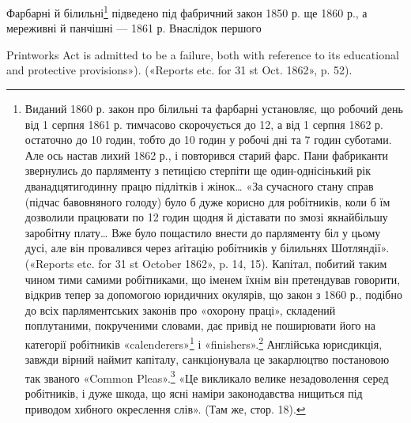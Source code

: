 Фарбарні й білильні\footnote{
Виданий 1860 р. закон про білильні та фарбарні установляє,
що робочий день від 1 серпня 1861 р. тимчасово скорочується до 12, а
від 1 серпня 1862 р. остаточно до 10 годин, тобто до 10 годин у робочі
дні та 7 годин суботами. Але ось настав лихий 1862 р., і повторився
старий фарс. Пани фабриканти звернулись до парляменту з петицією
стерпіти ще один-однісінький рік дванадцятигодинну працю підлітків
і жінок\dots{} «За сучасного стану справ (підчас бавовняного голоду) було б
дуже корисно для робітників, коли б їм дозволили працювати по 12 годин
щодня й діставати по змозі якнайбільшу заробітну плату\dots{} Вже було
пощастило внести до парляменту біл у цьому дусі, але він провалився
через аґітацію робітників у білильнях Шотляндії». («Reports etc. for
31 st October 1862», p. 14, 15). Капітал, побитий таким чином тими самими
робітниками, що іменем їхнім він претендував говорити, відкрив тепер
за допомогою юридичних окулярів, що закон з 1860 р., подібно до всіх
парляментських законів про «охорону праці», складений поплутаними,
покрученими словами, дає привід не поширювати його на категорії робітників
«calenderers»\footnote*{
— пресувальники сукна. \emph{Ред.}
} і «finishers».\footnote*{
— апретери. \emph{Ред.}
} Англійська юрисдикція, завжди
вірний наймит капіталу, санкціонувала це закарлюцтво постановою так
званого «Common Pleas».\footnote*{
— цивільний суд. \emph{Ред.}
} «Це викликало велике незадоволення серед
робітників, і дуже шкода, що ясні наміри законодавства нищиться під
приводом хибного окреслення слів». (Там же, стор. 18).
} підведено під фабричний закон 1850 р.
ще 1860 р., а мереживні й панчішні — 1861 р. Внаслідок першого

Printworks Act is admitted to be a failure, both with reference to its educational
and protective provisions»). («Reports etc. for 31 st Oct. 1862», p. 52).
\parbreak{}  %
